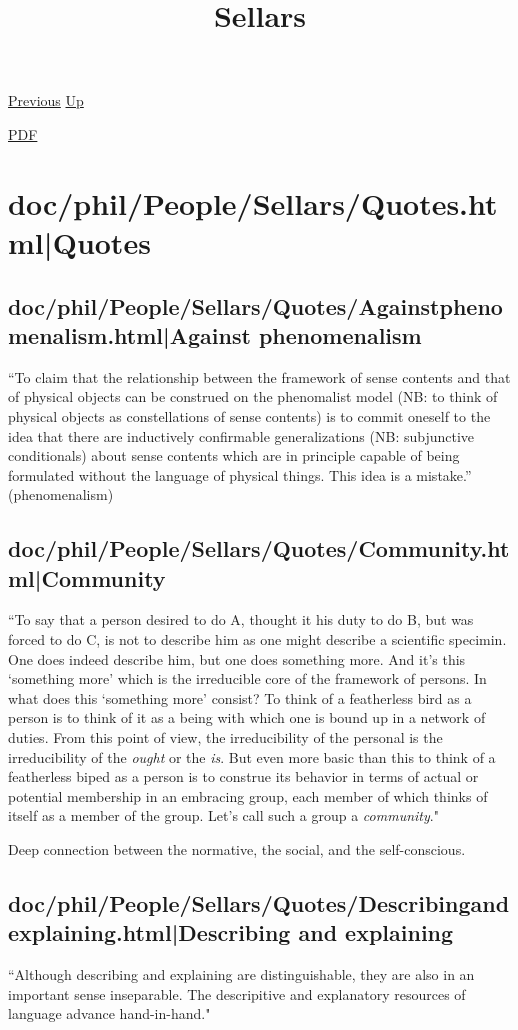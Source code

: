 \documentclass[12pt,a4paper]{report}
\begin{document}
 \href{doc/phil/People/Kant.html}{Previous} 
 \href{doc/phil/People.html}{Up} 

 \href{doc/phil/People/Sellars.pdf}{PDF} 
\title{Sellars}

\tableofcontents

\part{doc/phil/People/Sellars/Quotes.html|Quotes}

\chapter{doc/phil/People/Sellars/Quotes/Againstphenomenalism.html|Against phenomenalism}
``To claim that the relationship between the framework of sense contents and
that of physical objects can be construed on the phenomalist model (NB: to
think of physical objects as constellations of sense contents) is to commit
oneself to the idea that there are inductively confirmable generalizations (NB:
 subjunctive conditionals) about sense contents which are in principle capable
 of being formulated without the language of physical things. This idea is a
 mistake.'' (phenomenalism)

\chapter{doc/phil/People/Sellars/Quotes/Community.html|Community}
``To say that a person desired to do A, thought it his duty to do B, but was forced to do C, is not to describe him as one might describe a scientific specimin. One does indeed describe him, but one does something more. And it's this `something more' which is the irreducible core of the framework of persons. In what does this `something more' consist? To think of a featherless bird as a person is to think of it as a being with which  one is bound up in a network of duties. From this point of view, the irreducibility of the personal is the irreducibility of the \emph{ought} or the \emph{is}. But even more basic than this to think of a featherless biped as a person is to construe its behavior in terms of actual or potential membership in an embracing group, each member of which thinks of itself as a member of the group. Let's call such a group a \emph{community}."

Deep connection between the normative, the social, and the self-conscious.
\chapter{doc/phil/People/Sellars/Quotes/Describingandexplaining.html|Describing and explaining}
``Although describing and explaining are distinguishable, they are also in an
important sense inseparable. The descripitive and explanatory resources of
language advance hand-in-hand."
\end{document}
